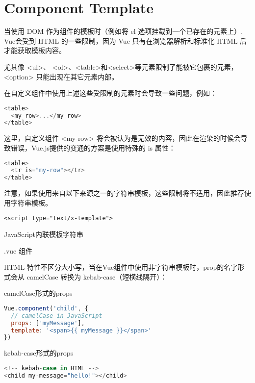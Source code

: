 \section{Component Template}


当使用 DOM 作为组件的模板时（例如将 el 选项挂载到一个已存在的元素上）, Vue会受到 HTML 的一些限制，因为 Vue 只有在浏览器解析和标准化 HTML 后才能获取模板内容。

尤其像 <ul>、 <ol>、<table>和<select>等元素限制了能被它包裹的元素， <option> 只能出现在其它元素内部。


在自定义组件中使用上述这些受限制的元素时会导致一些问题，例如：

\begin{lstlisting}[language=JavaScript]
<table>
  <my-row>...</my-row>
</table>
\end{lstlisting}

这里，自定义组件 <my-row> 将会被认为是无效的内容，因此在渲染的时候会导致错误，Vue.js提供的变通的方案是使用特殊的 is 属性：

\begin{lstlisting}[language=JavaScript]
<table>
  <tr is="my-row"></tr>
</table>
\end{lstlisting}

注意，如果使用来自以下来源之一的字符串模板，这些限制将不适用，因此推荐使用字符串模板。

\begin{compactitem}
\item \texttt{<script type="text/x-template">}
\item JavaScript内联模板字符串
\item .vue 组件
\end{compactitem}

HTML 特性不区分大小写，当在Vue组件中使用非字符串模板时，prop的名字形式会从 camelCase 转换为 kebab-case（短横线隔开）：

\begin{compactitem}
\item camelCase形式的props

\begin{lstlisting}[language=JavaScript]
Vue.component('child', {
  // camelCase in JavaScript
  props: ['myMessage'],
  template: '<span>{{ myMessage }}</span>'
})
\end{lstlisting}

\item kebab-case形式的props

\begin{lstlisting}[language=JavaScript]
<!-- kebab-case in HTML -->
<child my-message="hello!"></child>
\end{lstlisting}


\end{compactitem}



